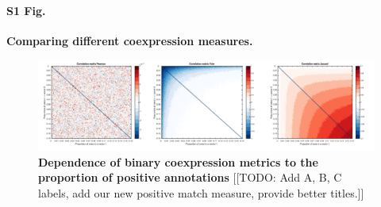 \documentclass[10pt,letterpaper]{article}
\begin{document}

\paragraph*{S1 Fig.}
{\bf Comparing different coexpression measures.}
\begin{figure}[h]
\label{fig:S_propOnes}
\centering
    \includegraphics[width=1\textwidth]{CoexpressionMeasures.pdf}
\caption{
\textbf{Dependence of binary coexpression metrics to the proportion of positive annotations}
[[TODO: Add A, B, C labels, add our new positive match measure, provide better titles.]]
}
\end{figure}


\end{document}
